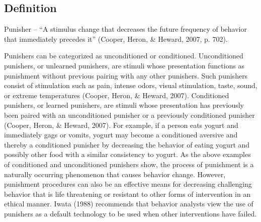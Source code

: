 \subsection{Definition}
Punisher – ``A stimulus change that decreases the future frequency of behavior that immediately precedes it'' (Cooper, Heron, \& Heward, 2007, p. 702).  

Punishers can be categorized as unconditioned or conditioned. Unconditioned punishers, or unlearned punishers, are stimuli whose presentation functions as punishment without previous pairing with any other punishers. Such punishers consist of stimulation such as pain, intense odors, visual stimulation, taste, sound, or extreme temperatures (Cooper, Heron, \& Heward, 2007).  Conditioned punishers, or learned punishers, are stimuli whose presentation has previously been paired with an unconditioned punisher or a previously conditioned punisher (Cooper, Heron, \& Heward, 2007).   For example, if a person eats yogurt and immediately gags or vomits, yogurt may become a conditioned aversive and thereby a conditioned punisher by decreasing the behavior of eating yogurt and possibly other food with a similar consistency to yogurt.  As the above examples of conditioned and unconditioned punishers show, the process of punishment is a naturally occurring phenomenon that causes behavior change.  However, punishment procedures can also be an effective means for decreasing challenging behavior that is life threatening or resistant to other forms of intervention in an ethical manner.  Iwata (1988) recommends that behavior analysts view the use of punishers as a default technology to be used when other interventions have failed.  

